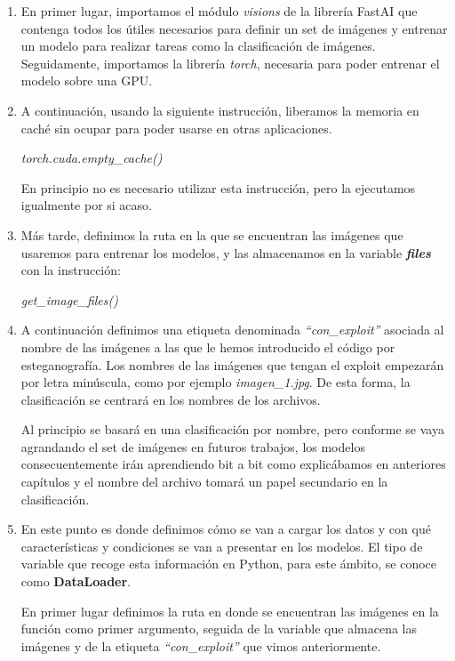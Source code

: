 \begin{enumerate}
\item En primer lugar, importamos el módulo \textit{visions} de la librería FastAI que contenga todos los útiles necesarios para definir un set de imágenes y entrenar un modelo para realizar tareas como la clasificación de imágenes. Seguidamente, importamos la librería \textit{torch}, necesaria para poder entrenar el modelo sobre una \ac{GPU}. %
\item A continuación, usando la siguiente instrucción, liberamos la memoria en caché sin ocupar para poder usarse en otras aplicaciones.

\begin{center}
\textit{torch.cuda.empty\_cache()}
\end{center}

En principio no es necesario utilizar esta instrucción, pero la ejecutamos igualmente por si acaso.
\item Más tarde, definimos la ruta en la que se encuentran las imágenes que usaremos para entrenar los modelos, y las almacenamos en la variable \textbf{\textit{files}} con la instrucción:

\begin{center}
\textit{get\_image\_files()}
\end{center}

\item A continuación definimos una etiqueta denominada \textit{``con\_exploit''} asociada al nombre de las imágenes a las que le hemos introducido el código por esteganografía. Los nombres de las imágenes que tengan el exploit empezarán por letra minúscula, como por ejemplo \textit{imagen\_1.jpg}. De esta forma, la clasificación se centrará en los nombres de los archivos.

Al principio se basará en una clasificación por nombre, pero conforme se vaya agrandando el set de imágenes en futuros trabajos, los modelos consecuentemente irán aprendiendo bit a bit como explicábamos en anteriores capítulos y el nombre del archivo tomará un papel secundario en la clasificación.

\item En este punto es donde definimos cómo se van a cargar los datos y con qué características y condiciones se van a presentar en los modelos. El tipo de variable que recoge esta información en Python, para este ámbito, se conoce como \textbf{DataLoader}.

En primer lugar definimos la ruta en donde se encuentran las imágenes en la función como primer argumento, seguida de la variable que almacena las imágenes y de la etiqueta \textit{``con\_exploit''} que vimos anteriormente.


\end{enumerate}
